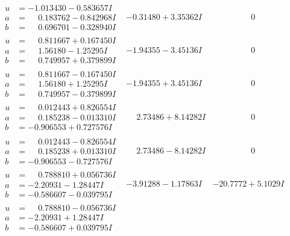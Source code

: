\documentclass[1p]{elsarticle_modified}
\theoremstyle{definition}
\begin{document}
$$\begin{array}{c|c|c}
\begin{aligned}
u &= -1.013430 - 0.583657 I \\
a &= \phantom{-}0.183762 - 0.842968 I \\
b &= \phantom{-}0.696701 - 0.328940 I\end{aligned}
 & -0.31480 + 3.35362 I & \phantom{-0.000000 } 0 \\ \hline\begin{aligned}
u &= \phantom{-}0.811667 + 0.167450 I \\
a &= \phantom{-}1.56180 - 1.25295 I \\
b &= \phantom{-}0.749957 + 0.379899 I\end{aligned}
 & -1.94355 - 3.45136 I & \phantom{-0.000000 } 0 \\ \hline\begin{aligned}
u &= \phantom{-}0.811667 - 0.167450 I \\
a &= \phantom{-}1.56180 + 1.25295 I \\
b &= \phantom{-}0.749957 - 0.379899 I\end{aligned}
 & -1.94355 + 3.45136 I & \phantom{-0.000000 } 0 \\ \hline\begin{aligned}
u &= \phantom{-}0.012443 + 0.826554 I \\
a &= \phantom{-}0.185238 - 0.013310 I \\
b &= -0.906553 + 0.727576 I\end{aligned}
 & \phantom{-}2.73486 + 8.14282 I & \phantom{-0.000000 } 0 \\ \hline\begin{aligned}
u &= \phantom{-}0.012443 - 0.826554 I \\
a &= \phantom{-}0.185238 + 0.013310 I \\
b &= -0.906553 - 0.727576 I\end{aligned}
 & \phantom{-}2.73486 - 8.14282 I & \phantom{-0.000000 } 0 \\ \hline\begin{aligned}
u &= \phantom{-}0.788810 + 0.056736 I \\
a &= -2.20931 - 1.28447 I \\
b &= -0.586607 - 0.039795 I\end{aligned}
 & -3.91288 - 1.17863 I & -20.7772 + 5.1029 I \\ \hline\begin{aligned}
u &= \phantom{-}0.788810 - 0.056736 I \\
a &= -2.20931 + 1.28447 I \\
b &= -0.586607 + 0.039795 I\end{aligned}

\end{array}$$
\end{document}
